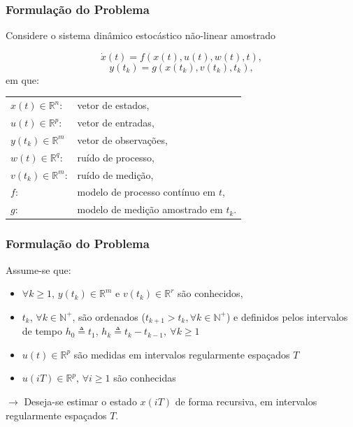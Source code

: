 \documentclass{beamer}
\begin{document}
\begin{frame}
	\frametitle{Formulação do Problema}
	Considere o sistema dinâmico estocástico não-linear amostrado
	
	\begin{equation*}\label{eq:processo}
	\dot{x}(t)=f(x(t),u(t),w(t),t),
	\end{equation*}
	\begin{equation*}\label{eq:obs}
	y(t_k)=g(x(t_k),v(t_k),t_k),
	\end{equation*}
	\vspace{0.3cm}
	em que:
	\vspace{0.4cm}
	
	\begin{tabular}{l l}
		\hfill
		$x(t) \in \mathbb{R}^n$:  	& vetor de estados, \\
		\hfill
		$u(t) \in \mathbb{R}^p$:  	& vetor de entradas, \\
		\hfill
		$y(t_k) \in \mathbb{R}^m$ 	& vetor de observações, \\
		\hfill
		$w(t) \in \mathbb{R}^q$:	 	& ruído de processo, \\
		\hfill
		$v(t_k) \in \mathbb{R}^m$: 	& ruído de medição, \\
		\hfill
		$f$: 		& modelo de processo contínuo em $t$, \\
		\hfill
		$g$:  	 	& modelo de medição amostrado em $t_k$.
	\end{tabular}

\end{frame}



\begin{frame}
	\frametitle{Formulação do Problema}
	Assume-se que:
	
	\begin{itemize}
		\item $\forall k \geq 1$, $y(t_k) \in \mathbb{R}^m$ e $v(t_k) \in \mathbb{R}^r$ são conhecidos,
		\item $t_k$, $\forall k \in \mathbb{N^+}$, são ordenados ($t_{k+1}>t_k,\forall k \in \mathbb{N^+}$) e definidos pelos intervalos de tempo $h_0 \triangleq t_1$, $h_k \triangleq t_k-t_{k-1}, \ \forall k \geq 1$
		\item $u(t) \in \mathbb{R}^p$ são medidas em intervalos regularmente espaçados $T$ 
		\item $u(iT) \in \mathbb{R}^p$, $\forall i \geq 1$ são conhecidas
	\end{itemize}
	
	\vspace{1cm}
	
	$\rightarrow$ Deseja-se estimar o estado $x(iT)$ de forma recursiva, em intervalos regularmente espaçados $T$.

\end{frame}
\end{document}
